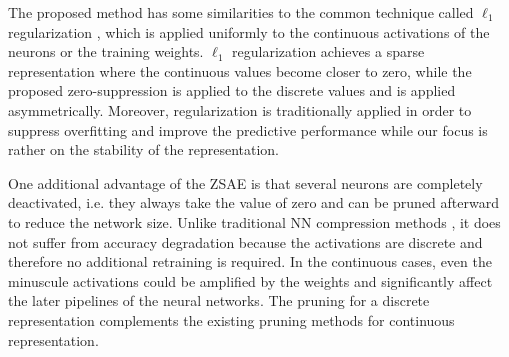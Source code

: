 The proposed method has some similarities to the common technique called $\ell_1$ regularization \cite{Goodfellow-et-al-2016},
which is applied uniformly to the continuous activations of the neurons or the training weights.
$\ell_1$ regularization achieves a sparse representation where the continuous values become closer to zero,
while the proposed zero-suppression is applied to the discrete values and is applied asymmetrically.
% 
Moreover, regularization is traditionally applied in order to suppress overfitting and improve the predictive performance
while our focus is rather on the stability of the representation.
% 



One additional advantage of the ZSAE is that
several neurons are completely deactivated, i.e. they always take the value of zero
and can be pruned afterward to reduce the network size.
Unlike traditional NN compression methods \cite{cheng2017survey}, it does not suffer from
accuracy degradation because the activations are discrete and therefore no additional retraining is required.
In the continuous cases, even the minuscule activations could be amplified by the weights and significantly affect the
later pipelines of the neural networks.
The pruning for a discrete representation complements the existing pruning methods for continuous representation.

